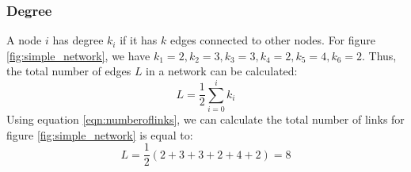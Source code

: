 \documentclass[12pt]{article}
\begin{document}
\subsubsection{Degree}
A node $i$ has degree $k_i$ if it has $k$ edges connected to other nodes. For figure \ref{fig:simple_network}, we have $k_1=2,k_2=3,k_3=3,k_4=2,k_5=4,k_6=2$. Thus, the total number of edges $L$ in a network can be calculated:
\begin{equation}
    L = \frac{1}{2}\sum^{i}_{i=0}{k_i}
    \label{eqn:numberoflinks}
\end{equation}
Using equation \ref{eqn:numberoflinks}, we can calculate the total number of links for figure \ref{fig:simple_network} is equal to:\\
\begin{equation}
    L =\frac{1}{2}(2+3+3+2+4+2)=8
\end{equation}
\end{document}
